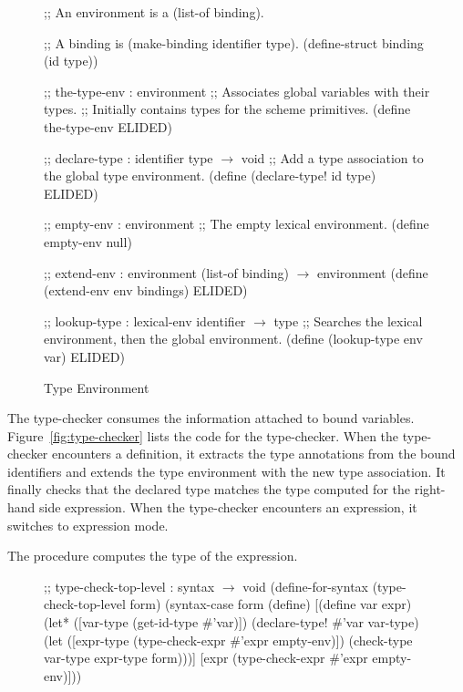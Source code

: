 \begin{schemeregion}
\begin{figure}
\begin{schemedisplay}
;; An environment is a (list-of binding).

;; A binding is (make-binding identifier type).
(define-struct binding (id type))

;; the-type-env : environment
;; Associates global variables with their types.
;; Initially contains types for the scheme primitives.
(define the-type-env ELIDED)

;; declare-type : identifier type $\rightarrow$ void
;; Add a type association to the global type environment.
(define (declare-type! id type) ELIDED)

;; empty-env : environment
;; The empty lexical environment.
(define empty-env null)

;; extend-env : environment (list-of binding) $\rightarrow$ environment
(define (extend-env env bindings) ELIDED)

;; lookup-type : lexical-env identifier $\rightarrow$ type
;; Searches the lexical environment, then the global environment.
(define (lookup-type env var) ELIDED)
\end{schemedisplay}
\caption{Type Environment}
\label{fig:type-env}
\end{figure}

The type-checker consumes the information attached to bound
variables. Figure~\ref{fig:type-checker} lists the code for the
type-checker.  When the type-checker encounters a definition, it
extracts the type annotations from the bound identifiers and extends
the type environment with the new type association. It finally checks
that the declared type matches the type computed for the right-hand
side expression.  When the type-checker encounters an expression, it
switches to expression mode. 

The  procedure computes the type of the
expression.
%
\begin{figure}[h!]
\begin{schemedisplay}
;; type-check-top-level : syntax $\rightarrow$ void 
(define-for-syntax (type-check-top-level form)
  (syntax-case form (define) 
    [(define var expr)
     (let* ([var-type (get-id-type #'var)])
       (declare-type! #'var var-type)
       (let ([expr-type (type-check-expr #'expr empty-env)])
         (check-type var-type expr-type form)))]
    [expr
     (type-check-expr #'expr empty-env)]))


\end{schemedisplay}
\end{figure}
\end{schemeregion}
